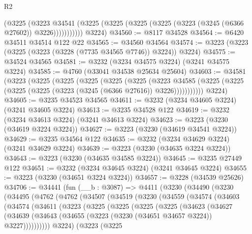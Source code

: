 \begin{lexlean}{R2}
\begin{coremodule}
              (@3225
                (@3223
                  @34541
                  (@3225 (@3225 (@3225 (@3225 (@3223 (@3245 (@6366 @27602)) @3226)))))))))))
      @3224)
@34560 := @8117 @34528
@34564 := @6420 @34511 @34514 @122 @22
@34565 := @34560 @34564
@34574 := @3223 (@3223 (@3225 (@3223 (@3228 (@7735 @34565 @7746)) @3224)) @3224)
@34575 := @34524 @34565
@34581 := @3232 (@3234 @34575 @3224) (@3241 @34575 @3224)
@34585 := @4760 (@33041 @34538 @25634 @25604)
@34603 := @34581
    (@3223
      (@3225
        (@3225
          (@3225
            (@3225
              (@3225
                (@3223
                  @34585
                  (@3225 (@3225 (@3225 (@3225 (@3223 (@3245 (@6366 @27616)) @3226)))))))))))
      @3224)
@34605 := @3235 @34523 @34565
@34611 := @3232 (@3234 @34605 @3224) (@3241 @34605 @3224)
@34613 := @3235 @34528 @122
@34619 := @3232 (@3234 @34613 @3224) (@3241 @34613 @3224)
@34623 := @3223 (@3230 (@34619 @3224 @3224))
@34627 := @3223 (@3230 (@34619 @34541 @3224))
@34629 := @3235 @34564 @122
@34635 := @3232 (@3234 @34629 @3224) (@3241 @34629 @3224)
@34639 := @3223 (@3230 (@34635 @3224 @3224))
@34643 := @3223 (@3230 (@34635 @34585 @3224))
@34645 := @3235 @27449 @122
@34651 := @3232 (@3234 @34645 @3224) (@3241 @34645 @3224)
@34655 := @3223 (@3230 (@34651 @3224 @3224))
@34657 := @3228 (@34539 @25626)
@34706 := @34441
    (fun (__b : @3087) =>
    @4411
      (@3230
        (@34490
          (@3230
            (@34495
              (@4762
                (@4762
                  (@34507
                    (@34519
                      (@3230
                        (@34559
                          (@34574
                            (@34603
                              (@34574
                                (@34611
                                  (@3223
                                    (@3225
                                      (@3225
                                        (@3225
                                          (@3225
                                            (@34623
                                              (@34627
                                                (@34639
                                                  (@34643
                                                    (@34655
                                                      (@3223
                                                        (@3230 (@34651 @34657 @3224))
                                                        @3227))))))))))
                                    @3224)
                                  (@3223
                                    (@3225

\end{coremodule}
\end{lexlean}
